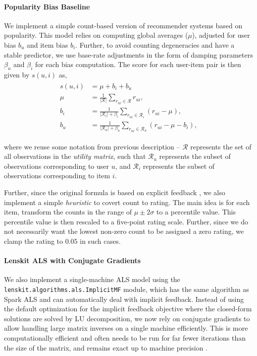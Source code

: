 \documentclass{article}
\begin{document}
\paragraph{Popularity Bias Baseline} We implement a simple count-based 
version of recommender systems based on popularity. This model 
relies on computing global averages ($\mu$), adjusted for user bias $b_u$ 
and item bias $b_i$. Further, to avoid counting degeneracies and have 
a stable predictor, we use base-rate adjustments in the form of damping 
parameters $\beta_u$ and $\beta_i$ for each bias computation. The score for 
each user-item pair is then given by $s(u,i)$ as,
\begin{align}
\begin{split}
s(u,i) &= \mu + b_i + b_u 	\\
\mu &= \frac{1}{\lvert \mathcal{R} \rvert} \sum_{r_{ui} \in \mathcal{R}} r_{ui}, \\
b_i &= \frac{1}{\lvert \mathcal{R}_i \rvert + \beta_i} \sum_{r_{ui} \in \mathcal{R}_i} \left( r_{ui} - \mu \right), \\
b_u &= \frac{1}{\lvert \mathcal{R}_u \rvert + \beta_u} \sum_{r_{ui} \in \mathcal{R}_u} \left( r_{ui} - \mu - b_i \right),
\end{split}
\end{align}

where we reuse some notation from previous description -- $\mathcal{R}$ 
represents the set of all observations in the \emph{utility matrix}, such 
that $\mathcal{R}_u$ represents the subset of observations corresponding to 
user $u$, and $\mathcal{R}_i$ represents the subset of observations 
corresponding to item $i$.

Further, since the original formula is based on explicit feedback \citep{KorenY2015AdvancesinCF}, we also implement a simple \emph{heuristic} to covert count to rating. The main idea is for each item, transform the counts in the range of $\mu \pm 2\sigma$ to a percentile value. This percentile value is then rescaled to a five-point rating scale. Further, since we do not necessarily want the lowest non-zero count to be assigned a zero rating, we clamp the rating to $0.05$ in such cases.

\paragraph{Lenskit ALS with Conjugate Gradients} We also implement a single-machine ALS model using the \texttt{lenskit.algorithms.als.ImplicitMF} module, which has the same algorithm as Spark ALS and can automatically deal with implicit feedback. Instead of using the default optimization for the implicit feedback objective where the closed-form solutions are solved by LU decomposition, we now rely on conjugate gradients to allow handling large matrix inverses on a single machine efficiently. This is more computationally efficient and often needs to be run for far fewer iterations than the size of the matrix, and remains exact up to machine precision \citep{Trefethen1997NumericalLA}.
\end{document}
